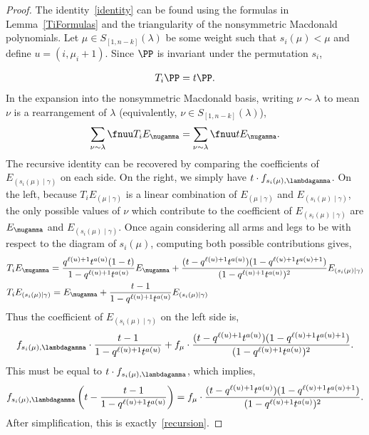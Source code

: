 \begin{proof}
The identity~\eqref{identity} can be found using the formulas in Lemma~\ref{TiFormulas} and the triangularity of the nonsymmetric Macdonald polynomials. Let $\mu \in S_{[1,n-k]}(\lambda)$ be some weight such that $s_i(\mu)<\mu$ and define $u=(i,\mu_{i}+1)$. Since $\PP$ is invariant under the permutation $s_i$,

\[ T_i \PP = t \PP.\]
In the expansion into the nonsymmetric Macdonald basis, writing $\nu \sim \lambda$ to mean $\nu$ is a rearrangement of $\lambda$ (equivalently, $\nu \in S_{[1,n-k]}(\lambda)$),
\[ \sum_{\nu \sim \lambda} \fnuu T_i E_{\nugamma} = \sum_{\nu \sim \lambda} \fnuu t E_{\nugamma}.   \]
The recursive identity can be recovered by comparing the coefficients of $E_{(s_i(\mu) \mid \gamma)}$ on each side. On the right, we simply have $t\cdot f_{s_i(\mu),\lambdagamma}$. On the left, because $T_i E_{(\mu \mid \gamma)}$ is a linear combination of $E_{(\mu \mid \gamma)}$ and $E_{(s_i(\mu) \mid \gamma)}$, the only possible values of $\nu$ which contribute to the coefficient of $E_{(s_i(\mu) \mid \gamma)}$ are $E_\mugamma$ and $E_{(s_i(\mu) \mid \gamma)}$. Once again considering all arms and legs to be with respect to the diagram of $s_i(\mu)$, computing both possible contributions gives,
\begin{align*}
     &T_i E_{\mugamma} =  \frac{q^{\ell(u)+1}t^{a(u)}(1-t)}{1-q^{\ell(u)+1}t^{a(u)}} E_{\mugamma} +  \frac{(t-q^{\ell(u)+1}t^{a(u)})(1-q^{\ell(u)+1}t^{a(u)+1})}{(1-q^{\ell(u)+1}t^{a(u)})^2} E_{(s_i(\mu) \mid \gamma)}\\
    &T_i E_{(s_i(\mu)\mid \gamma)} =  E_{\mugamma} +  \frac{t-1}{1-q^{\ell(u)+1}t^{a(u)}} E_{(s_i(\mu)\mid \gamma)}
\end{align*}
Thus the coefficient of $E_{(s_i(\mu)\mid \gamma)}$ on the left side is,
\[ f_{s_i(\mu),\lambdagamma} \cdot \frac{t-1}{1-q^{\ell(u)+1}t^{a(u)}} + f_\mu  \cdot \frac{(t-q^{\ell(u)+1}t^{a(u)})(1-q^{\ell(u)+1}t^{a(u)+1})}{(1-q^{\ell(u)+1}t^{a(u)})^2}.\]
This must be equal to $t\cdot f_{s_i(\mu),\lambdagamma}$, which implies,
\[ f_{s_i(\mu),\lambdagamma} \left( t-\frac{t-1}{1-q^{\ell(u)+1}t^{a(u)}} \right) = f_\mu  \cdot \frac{(t-q^{\ell(u)+1}t^{a(u)})(1-q^{\ell(u)+1}t^{a(u)+1})}{(1-q^{\ell(u)+1}t^{a(u)})^2}.\]
After simplification, this is exactly~\eqref{recursion}.
\end{proof}


